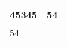\documentclass{article}
\begin{document}
 
\Large 
\begin{tabular}{|l|l|}
\hline 
45345 & 54\\
\hline 
54 & \\
\hline 
\end{tabular}
\end{document}
